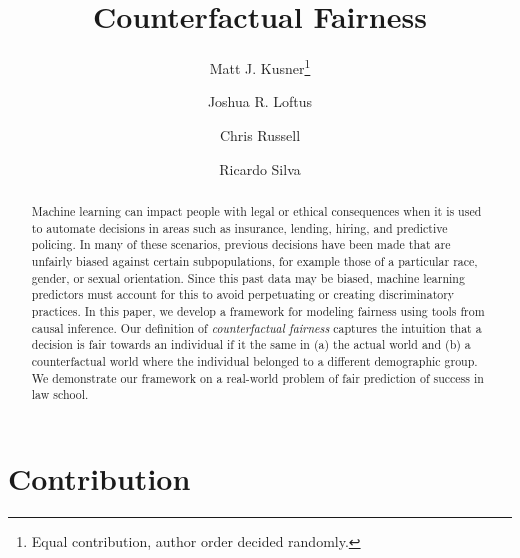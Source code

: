 \documentclass{article}[12pt]
\title{Counterfactual Fairness}
\author[1,2]{Matt J. Kusner\thanks{Equal contribution, author order decided randomly.}}
\author[1,3]{Joshua R. Loftus\samethanks}
\author[1,4]{Chris Russell\samethanks}
\author[1,5]{Ricardo Silva}
\affil[1]{Alan Turing Institute}
\affil[2]{University of Warwick}
\affil[3]{University of Cambridge}
\affil[4]{University of Edinburgh}
\affil[5]{University College London}
\date{}
\begin{document}
\maketitle




\begin{abstract} 
  Machine learning can impact people with legal or ethical
  consequences when it is used
  to automate decisions in areas such as insurance, lending, hiring,
  and predictive policing.  In many of these scenarios,
  previous decisions have been made that are unfairly biased against
  certain subpopulations, for example those of a particular race, gender, or
  sexual orientation.  Since this past data may be biased,
  machine learning predictors must account for this to avoid
  perpetuating or creating discriminatory practices.
  In this paper, we develop a framework for modeling fairness
  using tools from causal inference. Our definition of
  \emph{counterfactual fairness} captures the
  intuition that a decision is fair towards an individual if it 
  the same in (a) the actual world and (b) a counterfactual world
  where the individual belonged to a different demographic
  group. We demonstrate our framework on a real-world problem of fair
  prediction of success in law school.
\end{abstract} 

\section{Contribution}
\label{sec:introduction}

\end{document}
